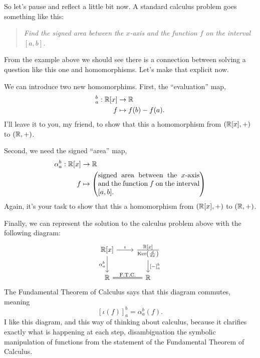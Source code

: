 \documentclass{ximera}
\begin{document}
So let's pause and reflect a little bit now. A standard calculus
problem goes something like this:

\begin{quote}
  \textit{Find the signed area between the $x$-axis and the function
    $f$ on the interval $[a,b]$.}
\end{quote}

From the example above we should see there is a connection between
solving a question like this one and homomorphisms. Let's make that
explicit now.

We can introduce two new homomorphims. First, the ``evaluation'' map,
  \begin{align*}
    [-]_a^b: \R[x]&\to\R\\
    f &\mapsto f(b)-f(a).
  \end{align*}
I'll leave it to you, my friend, to show that this a homomorphism from
$(\mathbb R[x],+)$ to $(\mathbb R,+)$.


Second, we need the signed ``area'' map,
  \begin{align*}
    \alpha_a^b :\R[x]&\to \R\\
    f &\mapsto \left(\begin{minipage}{2in}signed area between the $x$-axis and the function $f$ on
    the interval $[a,b]$.\end{minipage}\right)
  \end{align*}
Again, it's your task to show that this a homomorphism from
$(\mathbb R[x],+)$ to $(\mathbb R,+)$.

Finally, we can represent the solution to the calculus problem above
with the following diagram:
\[
\begin{tikzcd}
  \R[x] \ar[d,"{\alpha_a^b}",swap] \ar[r,"\iota"]  &  \frac{\R[x]}{\ker\left(\frac{d}{dx}\right)} \ar[d,"{[-]_a^b}"]\\
  \R \ar[r,equal,"\text{F.T.C.}"]  & \R
\end{tikzcd}
\]
The Fundamental Theorem of
Calculus says that this diagram commutes, meaning
\[
  [\iota(f)]_a^b = \alpha_a^b(f).
\]
I like this diagram, and this way of thinking about calculus, because
it clarifies exactly what is happening at each step, disambiguation
the symbolic manipulation of functions from the statement of the Fundamental Theorem of Calculus.
\end{document}
